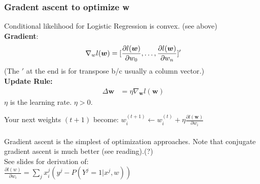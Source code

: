 \subsubsection{Gradent ascent to optimize w}
Conditional likelihood for Logistic Regression is convex.  (see above)  \hfill \\
\textbf{Gradient}:  \hfill \\
\begin{align*}
	\nabla_w l(\bm{w}) = [\frac{\partial l(\bm{w})}{\partial w_0}, \dots, \frac{\partial l(\bm{w})}{\partial w_n}]'  \hfill \\
\end{align*}
	(The $'$ at the end is for transpose b/c usually a column vector.)  \hfill \\
\textbf{Update Rule:} \hfill \\
\begin{align*}
	\Delta \bm{w} &= \eta \nabla_{\bm{w}} l(\bm{w})
\end{align*}
$\eta$ is the learning rate.  $\eta > 0$.

Your next weights $(t+1)$ become: 
$w_i^{(t+1)} \leftarrow w_i^{(t)} + \eta \frac{\partial l(\bm{w})}{\partial w_i}$   \hfill \\
\hfill \\
Gradient ascent is the simplest  of optimization approaches.  
Note that conjugate gradient ascent is much better (see reading).(?)  \hfill \\

See slides for derivation of: \hfill \\
$\displaystyle \frac{\partial l(w)}{\partial w_i} = \sum_j x_i^j (y^j - P(Y^j = 1 | x^j, w))$

